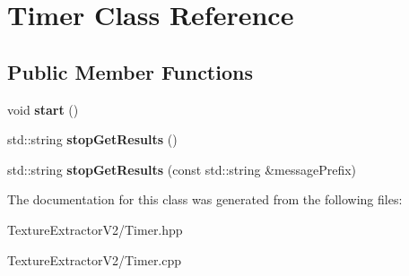 \hypertarget{class_timer}{}\section{Timer Class Reference}
\label{class_timer}
\subsection*{Public Member Functions}
\begin{DoxyCompactItemize}
\item 
\hypertarget{class_timer_a3a8b5272198d029779dc9302a54305a8}{}void {\bfseries start} ()\label{class_timer_a3a8b5272198d029779dc9302a54305a8}

\item 
\hypertarget{class_timer_aa7dd6187a7dec39be17dfb4f6184db16}{}std\+::string {\bfseries stop\+Get\+Results} ()\label{class_timer_aa7dd6187a7dec39be17dfb4f6184db16}

\item 
\hypertarget{class_timer_a573a098aacebc4be22ce73bd42725e17}{}std\+::string {\bfseries stop\+Get\+Results} (const std\+::string \&message\+Prefix)\label{class_timer_a573a098aacebc4be22ce73bd42725e17}

\end{DoxyCompactItemize}


The documentation for this class was generated from the following files\+:\begin{DoxyCompactItemize}
\item 
Texture\+Extractor\+V2/Timer.\+hpp\item 
Texture\+Extractor\+V2/Timer.\+cpp\end{DoxyCompactItemize}
